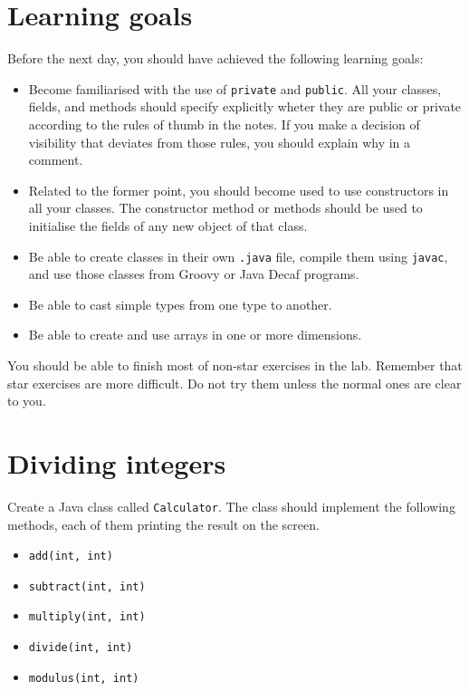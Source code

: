 \documentclass{article}
\begin{document}
\section*{Learning goals}
\label{sec:learning-goals}

Before the next day, you should have achieved the following learning
goals: 

\begin{itemize}
\item Become familiarised with the use of \verb+private+ and
  \verb+public+. All your classes, fields, and methods should specify
  explicitly wheter they are public or private according to the rules
  of thumb in the notes. If you make a decision of visibility that
  deviates from those rules, you should explain why in a comment.
\item Related to the former point, you should become used to use
  constructors in all your classes. The constructor method or methods
  should be used to initialise the fields of any new object of that
  class.
\item Be able to create classes in their own \verb+.java+ file, 
  compile them using
  \verb+javac+, and use those classes from 
  Groovy or Java Decaf programs. 
\item Be able to cast simple types from one type to another.
\item Be able to create and use arrays in one or more dimensions. 
\end{itemize}

You should be able to finish most of non-star exercises in the
lab. Remember that star exercises are more difficult. Do not try them
unless the normal ones are clear to you. 

\section{Dividing integers}
\label{sec:casting}

Create a Java class called \verb+Calculator+. The class should
implement the following methods, each of them printing the result on
the screen. 

\begin{itemize}
\item \verb+add(int, int)+
\item \verb+subtract(int, int)+
\item \verb+multiply(int, int)+
\item \verb+divide(int, int)+
\item \verb+modulus(int, int)+
\end{itemize}
\end{document}
